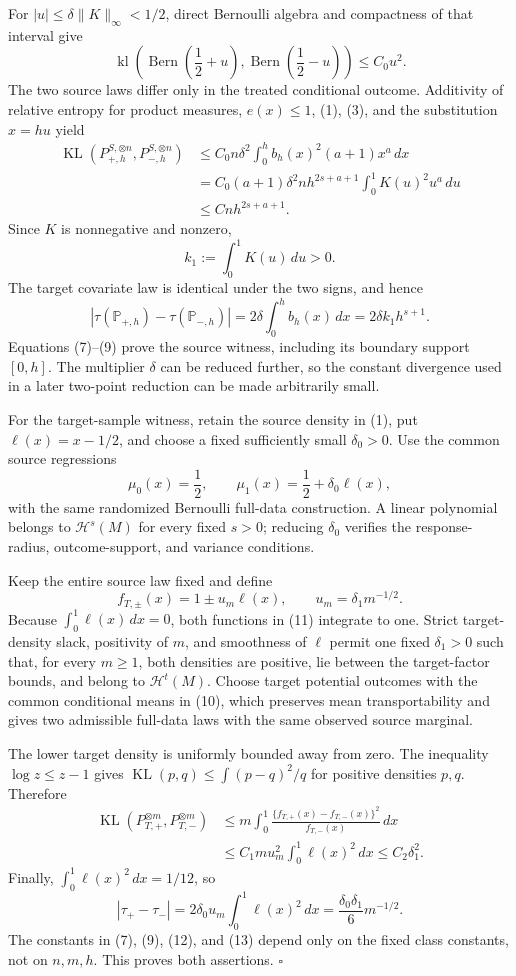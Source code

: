 For \(|u|\le\delta\lVert K\rVert_\infty<1/2\), direct Bernoulli algebra and compactness of that interval give
\[
\operatorname{kl}\!\left(\operatorname{Bern}\!\left(\frac12+u\right),
\operatorname{Bern}\!\left(\frac12-u\right)\right)
\le C_0u^2.
\tag{6}
\]
The two source laws differ only in the treated conditional outcome. Additivity of relative entropy for product measures, \(e(x)\le1\), (1), (3), and the substitution \(x=hu\) yield
\[
\begin{aligned}
\operatorname{KL}(P_{+,h}^{S,\otimes n},P_{-,h}^{S,\otimes n})
&\le C_0n\delta^2\int_0^hb_h(x)^2(a+1)x^a\,dx\\
&=C_0(a+1)\delta^2nh^{2s+a+1}
  \int_0^1K(u)^2u^a\,du\\
&\le Cnh^{2s+a+1}.
\end{aligned}
\tag{7}
\]
Since \(K\) is nonnegative and nonzero,
\[
k_1:=\int_0^1K(u)\,du>0.
\tag{8}
\]
The target covariate law is identical under the two signs, and hence
\[
|\tau(\mathbb P_{+,h})-\tau(\mathbb P_{-,h})|
=2\delta\int_0^hb_h(x)\,dx
=2\delta k_1h^{s+1}.
\tag{9}
\]
Equations (7)--(9) prove the source witness, including its boundary support \([0,h]\). The multiplier \(\delta\) can be reduced further, so the constant divergence used in a later two-point reduction can be made arbitrarily small.

For the target-sample witness, retain the source density in (1), put \(\ell(x)=x-1/2\), and choose a fixed sufficiently small \(\delta_0>0\). Use the common source regressions
\[
\mu_0(x)=\frac12,
\qquad
\mu_1(x)=\frac12+\delta_0\ell(x),
\tag{10}
\]
with the same randomized Bernoulli full-data construction. A linear polynomial belongs to \(\mathcal H^s(M)\) for every fixed \(s>0\); reducing \(\delta_0\) verifies the response-radius, outcome-support, and variance conditions.

Keep the entire source law fixed and define
\[
f_{T,\pm}(x)=1\pm u_m\ell(x),
\qquad
u_m=\delta_1m^{-1/2}.
\tag{11}
\]
Because \(\int_0^1\ell(x)\,dx=0\), both functions in (11) integrate to one. Strict target-density slack, positivity of \(m\), and smoothness of \(\ell\) permit one fixed \(\delta_1>0\) such that, for every \(m\ge1\), both densities are positive, lie between the target-factor bounds, and belong to \(\mathcal H^t(M)\). Choose target potential outcomes with the common conditional means in (10), which preserves mean transportability and gives two admissible full-data laws with the same observed source marginal.

The lower target density is uniformly bounded away from zero. The inequality \(\log z\le z-1\) gives \(\operatorname{KL}(p,q)\le\int(p-q)^2/q\) for positive densities \(p,q\). Therefore
\[
\begin{aligned}
\operatorname{KL}(P_{T,+}^{\otimes m},P_{T,-}^{\otimes m})
&\le m\int_0^1
\frac{\{f_{T,+}(x)-f_{T,-}(x)\}^2}{f_{T,-}(x)}\,dx\\
&\le C_1m u_m^2\int_0^1\ell(x)^2\,dx
\le C_2\delta_1^2.
\end{aligned}
\tag{12}
\]
Finally, \(\int_0^1\ell(x)^2\,dx=1/12\), so
\[
|\tau_+-\tau_-|
=2\delta_0u_m\int_0^1\ell(x)^2\,dx
=\frac{\delta_0\delta_1}{6}m^{-1/2}.
\tag{13}
\]
The constants in (7), (9), (12), and (13) depend only on the fixed class constants, not on \(n,m,h\). This proves both assertions. \(\square\)